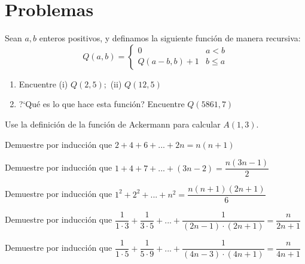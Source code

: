 \section*{Problemas}


\begin{problema}
	Sean $a,b$ enteros positivos, y definamos la siguiente función de manera recursiva:
	$$
	Q(a,b)=
	\begin{cases}
		0 & a<b \\
		Q(a-b,b)+1 & b \leq a
	\end{cases}
	$$
	\begin{enumerate}
		\item Encuentre (i) $Q(2,5);$ (ii) $Q(12,5)$
		\item ?`Qu\'e es lo que hace esta función? Encuentre $Q(5861,7)$
	\end{enumerate}
\end{problema}



\begin{problema}
	Use la definición de la función de Ackermann para calcular $A(1,3).$
\end{problema}



\begin{problema}
	Demuestre por inducción que 
	$\displaystyle 2+4+6+...+2n=n(n+1)$
\end{problema}



\begin{problema}
	Demuestre por inducción que 
	$\displaystyle 1+4+7+...+\left( 3n-2 \right)=\dfrac{n\left( 3n-1 \right)}{2}$
\end{problema}



\begin{problema}
	Demuestre por inducción que 
	$\displaystyle 1^{2}+2^{2}+...+n^{2}=\dfrac{n(n+1)(2n+1)}{6}$
\end{problema}



\begin{problema}
	Demuestre por inducción que 
	$\displaystyle \dfrac{1}{1\cdot 3}+\dfrac{1}{3\cdot 5}+...+\dfrac{1}{\left( 2n-1 \right)\cdot \left( 2n+1 \right)}=\dfrac{n}{2n+1}$
\end{problema}



\begin{problema}
	Demuestre por inducción que 		
	$\displaystyle \dfrac{1}{1\cdot 5}+ \dfrac{1}{5 \cdot 9}+...+\dfrac{1}{(4n-3)\cdot (4n+1)}=\dfrac{n}{4n+1}$
\end{problema}



